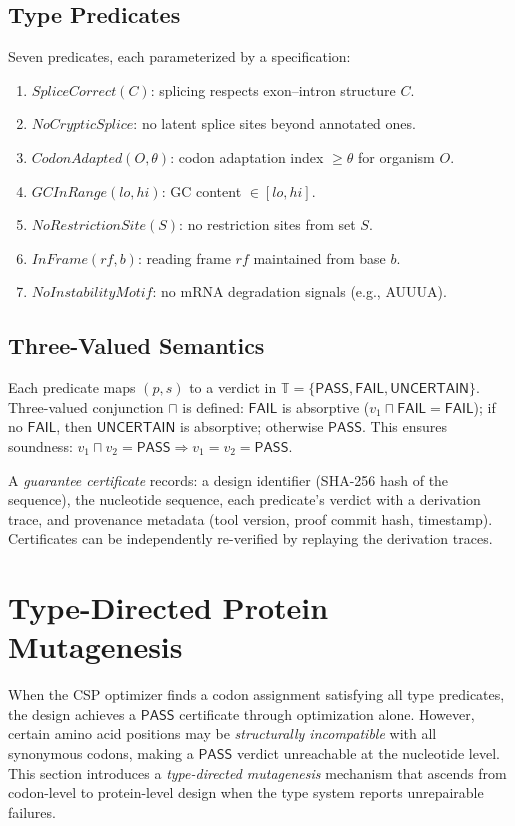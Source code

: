 \documentclass[runningheads]{llncs}
\newcommand{\PASS}{\ensuremath{\mathsf{PASS}}\xspace}
\newcommand{\FAIL}{\ensuremath{\mathsf{FAIL}}\xspace}
\newcommand{\UNCERTAIN}{\ensuremath{\mathsf{UNCERTAIN}}\xspace}
\newcommand{\tvl}{\mathbb{T}}
\newcommand{\tand}{\sqcap}
\begin{document}
\subsection{Type Predicates}

Seven predicates, each parameterized by a specification:
\begin{enumerate}[leftmargin=*,itemsep=0pt,topsep=1pt]
\item $\mathit{SpliceCorrect}(C)$: splicing respects exon--intron structure $C$.
\item $\mathit{NoCrypticSplice}$: no latent splice sites beyond annotated ones.
\item $\mathit{CodonAdapted}(O,\theta)$: codon adaptation index $\ge\theta$ for organism $O$.
\item $\mathit{GCInRange}(lo,hi)$: GC content $\in [lo,hi]$.
\item $\mathit{NoRestrictionSite}(S)$: no restriction sites from set $S$.
\item $\mathit{InFrame}(rf,b)$: reading frame $rf$ maintained from base $b$.
\item $\mathit{NoInstabilityMotif}$: no mRNA degradation signals (e.g., AUUUA).
\end{enumerate}

\subsection{Three-Valued Semantics}\label{sec:tvl}

Each predicate maps $(p,s)$ to a verdict in $\tvl = \{\PASS,\FAIL,\UNCERTAIN\}$.
Three-valued conjunction $\tand$ is defined: $\FAIL$ is absorptive ($v_1 \tand \FAIL = \FAIL$); if no $\FAIL$, then $\UNCERTAIN$ is absorptive; otherwise $\PASS$.
This ensures soundness: $v_1 \tand v_2 = \PASS \Rightarrow v_1 = v_2 = \PASS$.

A \emph{guarantee certificate} records: a design identifier (SHA-256 hash of the sequence), the nucleotide sequence, each predicate's verdict with a derivation trace, and provenance metadata (tool version, proof commit hash, timestamp). Certificates can be independently re-verified by replaying the derivation traces.

\section{Type-Directed Protein Mutagenesis}\label{sec:mutagenesis}

When the CSP optimizer finds a codon assignment satisfying all type predicates, the design achieves a \PASS{} certificate through optimization alone.
However, certain amino acid positions may be \emph{structurally incompatible} with all synonymous codons, making a \PASS{} verdict unreachable at the nucleotide level.
This section introduces a \emph{type-directed mutagenesis} mechanism that ascends from codon-level to protein-level design when the type system reports unrepairable failures.
\end{document}
